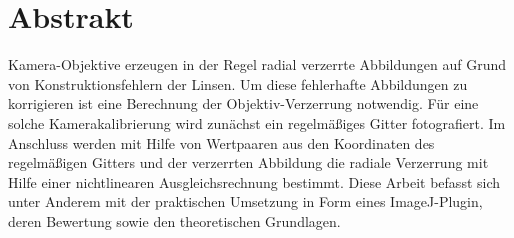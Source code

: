 \section{Abstrakt}
\label{sec:Abstrakt}
Kamera-Objektive erzeugen in der Regel radial verzerrte Abbildungen auf Grund von Konstruktionsfehlern der Linsen. 
Um diese fehlerhafte Abbildungen zu korrigieren ist eine Berechnung der Objektiv-Verzerrung notwendig. 
Für eine solche Kamerakalibrierung wird zunächst ein regelmäßiges Gitter fotografiert. 
Im Anschluss werden mit Hilfe von Wertpaaren aus den Koordinaten des regelmäßigen Gitters und der verzerrten Abbildung die radiale Verzerrung mit Hilfe einer nichtlinearen Ausgleichsrechnung bestimmt. 
Diese Arbeit befasst sich unter Anderem mit der praktischen Umsetzung in Form eines ImageJ-Plugin, deren Bewertung sowie den theoretischen Grundlagen.  
%




